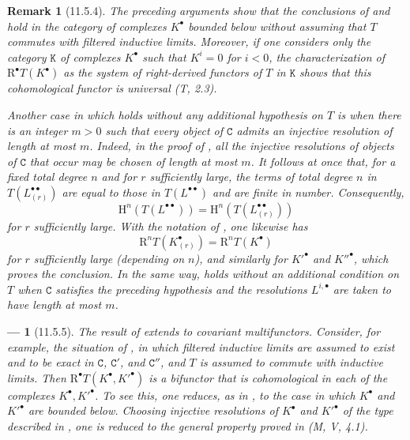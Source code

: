 \documentclass[oneside]{amsart}
\theoremstyle{ega-env-style}
\newtheorem*{env}{---}
\theoremstyle{ega-thm-env-style}
\theoremstyle{ega-defn-env-style}
\newtheorem*{remark}{Remark}
\def\cat{\mathtt}                   %
\def\HH{\mathrm{H}}                 %
\def\RR{\mathrm{R}}                 %
\newcommand{\oldpage}[2][]{{\marginnote{\normalfont{\textbf{#1}~|~#2}}}\ignorespaces}
\let\EGAOriginalLabel\label
\renewcommand{\label}[1]{\phantomsection\EGAOriginalLabel{#1}}
\begin{document}
\begin{remark}[11.5.4]
\label{0.11.5.4}
The preceding arguments show that the conclusions of  and  hold in the category of complexes $K^\bullet$ bounded below without assuming that $T$ commutes with filtered inductive limits.
Moreover, if one considers only the category $\cat{K}$ of complexes $K^\bullet$ such that $K^i=0$ for $i<0$, the characterization of $\RR^\bullet T(K^\bullet)$ as the system of right-derived functors of $T$ in $\cat{K}$ shows that this cohomological functor is \emph{universal} (T, 2.3).

Another case in which  holds without any additional hypothesis on $T$ is when there is an integer $m>0$ such that every object of $\cat{C}$ admits an injective resolution of length at most $m$.
Indeed, in the proof of , all the injective resolutions of objects of $\cat{C}$ that occur may be chosen of length at most $m$.
It follows at once that, for a fixed total degree $n$ and for $r$ sufficiently large, the terms of total degree $n$ in $T(L^{\bullet\bullet}_{(r)})$ are equal to those in $T(L^{\bullet\bullet})$ and are finite in number.
Consequently,
\[
  \HH^n(T(L^{\bullet\bullet}))
  =\HH^n(T(L^{\bullet\bullet}_{(r)}))
\]
for $r$ sufficiently large.
With the notation of , one likewise has
\[
  \RR^nT(K^\bullet_{(r)})=\RR^nT(K^\bullet)
\]
for $r$ sufficiently large (depending on $n$), and similarly for $K'^\bullet$ and $K''^\bullet$, which proves the conclusion.
In the same way,  holds without an additional condition on $T$ when $\cat{C}$ satisfies the preceding hypothesis and the resolutions $L^{i,\bullet}$ are taken to have length at most $m$.
\end{remark}

\begin{env}[11.5.5]
\label{0.11.5.5}
The result of  extends to covariant multifunctors.
Consider, for example, the situation of , in which filtered inductive limits are assumed to exist and to be exact in $\cat{C}$, $\cat{C}'$, and $\cat{C}''$,
\oldpage[0\textsubscript{III}]{39}
and $T$ is assumed to commute with inductive limits.
Then $\RR^\bullet T(K^\bullet,K'^\bullet)$ is a bifunctor that is cohomological in each of the complexes $K^\bullet,K'^\bullet$.
To see this, one reduces, as in , to the case in which $K^\bullet$ and $K'^\bullet$ are bounded below.
Choosing injective resolutions of $K^\bullet$ and $K'^\bullet$ of the type described in , one is reduced to the general property proved in (M, V, 4.1).
\end{env}
\end{document}
